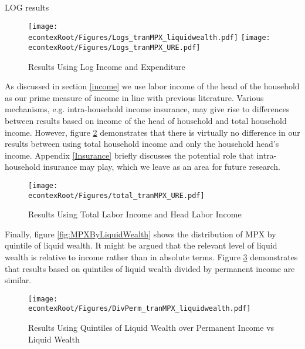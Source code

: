 \documentclass[titlepage]{\econtex}\newcommand{\texname}{ConsumptionHeterogeneity}
\begin{document}
LOG results

\begin{figure} 
	\begin{centering}
		\texttt{[image: \\econtexRoot/Figures/Logs\_tranMPX\_liquidwealth.pdf]}
		\texttt{[image: \\econtexRoot/Figures/Logs\_tranMPX\_URE.pdf]}
		\caption{Results Using Log Income and Expenditure}
		\label{fig:Robust_Logs}
	\end{centering}
\end{figure}

As discussed in section \ref{income} we use labor income of the head of the household as our prime measure of income in line with previous literature. Various mechanisms, e.g. intra-household income insurance, may give rise to differences between results based on income of the head of household and total household income. However, figure \ref{fig:Robust_TotalvsHead} demonstrates that there is virtually no difference in our results between using total household income and only the household head's income. Appendix \ref{Insurance} briefly discusses the potential role that intra-household insurance may play, which we leave as an area for future research. 

\begin{figure} 
	\begin{centering}
		\texttt{[image: \\econtexRoot/Figures/total\_tranMPX\_URE.pdf]}
		\caption{Results Using Total Labor Income and Head Labor Income}
		\label{fig:Robust_TotalvsHead}
	\end{centering}
\end{figure}

Finally, figure \ref{fig:MPXByLiquidWealth} shows the distribution of MPX by quintile of liquid wealth. It might be argued that the relevant level of liquid wealth is relative to income rather than in absolute terms. Figure \ref{fig:Robust_DivPerm} demonstrates that results based on quintiles of liquid wealth divided by permanent income are similar.

\begin{figure} 
	\begin{centering}
		\texttt{[image: \\econtexRoot/Figures/DivPerm\_tranMPX\_liquidwealth.pdf]}
		\caption{Results Using Quintiles of Liquid Wealth over Permanent Income vs Liquid Wealth}
		\label{fig:Robust_DivPerm}
	\end{centering}
\end{figure}


\FloatBarrier
\end{document}
